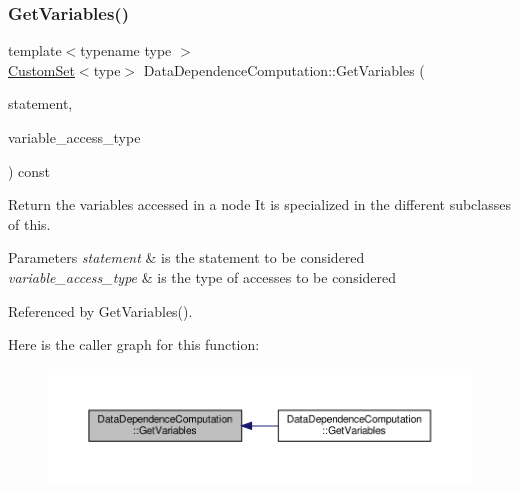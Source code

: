 \subsubsection{\texorpdfstring{Get\+Variables()}{GetVariables()}\hspace{0.1cm}{\footnotesize\ttfamily [1/2]}}
{\footnotesize\ttfamily template$<$typename type $>$ \\
\hyperlink{custom__set_8hpp_a615bc2f42fc38a4bb1790d12c759e86f}{Custom\+Set}$<$type$>$ Data\+Dependence\+Computation\+::\+Get\+Variables (\begin{DoxyParamCaption}\item[{const \hyperlink{graph_8hpp_abefdcf0544e601805af44eca032cca14}{vertex}}]{statement,  }\item[{const \hyperlink{function__behavior_8hpp_a68c28bfcfefbe63cece191e941af0409}{Function\+Behavior\+\_\+\+Variable\+Access\+Type}}]{variable\+\_\+access\+\_\+type }\end{DoxyParamCaption}) const\hspace{0.3cm}{\ttfamily [protected]}}



Return the variables accessed in a node It is specialized in the different subclasses of this. 


\begin{DoxyParams}{Parameters}
{\em statement} & is the statement to be considered \\
\hline
{\em variable\+\_\+access\+\_\+type} & is the type of accesses to be considered \\
\hline
\end{DoxyParams}


Referenced by Get\+Variables().

Here is the caller graph for this function\+:
\nopagebreak
\begin{figure}[H]
\begin{center}
\leavevmode
\includegraphics[width=350pt]{d3/dc0/classDataDependenceComputation_afc0ac97b717aedd766f8deffc14cfee8_icgraph}
\end{center}
\end{figure}
\mbox{\label{classDataDependenceComputation_a3c07664d77f1db17cd033b086900bba0}} 
